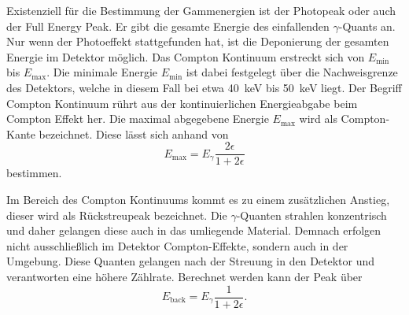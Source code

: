 Existenziell für die Bestimmung der Gammenergien ist der Photopeak oder auch der Full Energy Peak.
Er gibt die gesamte Energie des einfallenden $\gamma$-Quants an. Nur wenn der Photoeffekt stattgefunden hat, ist die Deponierung der 
gesamten Energie im Detektor möglich. 
Das Compton Kontinuum erstreckt sich von $E_{\text{min}}$ bis $E_{\text{max}}$. Die minimale Energie $E_{\text{min}}$ ist dabei festgelegt über
die Nachweisgrenze des Detektors, welche in diesem Fall bei etwa \qty{40}{\kilo\eV} bis \qty{50}{\kilo\eV} liegt. Der Begriff Compton
Kontinuum rührt aus der kontinuierlichen Energieabgabe beim Compton Effekt her.
Die maximal abgegebene Energie $E_{\text{max}}$ wird als Compton-Kante bezeichnet.
Diese lässt sich anhand von
\begin{equation}
    E_{\text{max}} = E_\gamma \frac{2 \epsilon}{1+2\epsilon}
    \label{eqn:Ecompton}
\end{equation}
bestimmen.

Im Bereich des Compton Kontinuums kommt es zu einem zusätzlichen Anstieg, dieser wird als Rückstreupeak
bezeichnet. Die $\gamma$-Quanten strahlen konzentrisch und daher gelangen diese auch in das umliegende Material.
Demnach erfolgen nicht ausschließlich im Detektor Compton-Effekte, sondern auch in der Umgebung. Diese Quanten gelangen nach der
Streuung in den Detektor und verantworten eine höhere Zählrate.
Berechnet werden kann der Peak über
\begin{equation}
    E_{\text{back}} = E_\gamma \frac{1}{1+2\epsilon}.
    \label{eqn:Erückstreu}
\end{equation}


